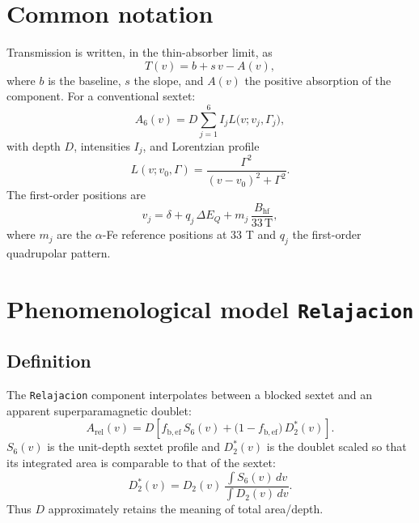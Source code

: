 \documentclass[11pt,a4paper]{article}
\newcommand{\BHF}{B_{\mathrm{hf}}}
\newcommand{\dEQ}{\Delta E_Q}
\newcommand{\code}[1]{\texttt{\small #1}}
\begin{document}
\section{Common notation}

Transmission is written, in the thin-absorber limit, as
\begin{equation}
  T(v)=b+s\,v-A(v),
\end{equation}
where $b$ is the baseline, $s$ the slope, and $A(v)$ the positive absorption of
the component. For a conventional sextet:
\begin{equation}
  A_{6}(v)=D\sum_{j=1}^{6} I_j L\bigl(v; v_j,\Gamma_j\bigr),
\end{equation}
with depth $D$, intensities $I_j$, and Lorentzian profile
\begin{equation}
  L(v;v_0,\Gamma)=\frac{\Gamma^2}{(v-v_0)^2+\Gamma^2}.
\end{equation}
The first-order positions are
\begin{equation}
  v_j = \delta + q_j\,\dEQ + m_j\,\frac{\BHF}{33\,\mathrm{T}},
\end{equation}
where $m_j$ are the $\alpha$-Fe reference positions at $33$ T and $q_j$ the
first-order quadrupolar pattern.

\section{Phenomenological model \code{Relajacion}}

\subsection{Definition}

The \code{Relajacion} component interpolates between a blocked sextet and an
apparent superparamagnetic doublet:
\begin{equation}
  A_{\mathrm{rel}}(v)=D\left[
  f_{\mathrm{b,ef}}\,S_6(v)
  +\bigl(1-f_{\mathrm{b,ef}}\bigr)\,D_2^{\ast}(v)
  \right].
  \label{eq:rel-phen}
\end{equation}
$S_6(v)$ is the unit-depth sextet profile and $D_2^{\ast}(v)$ is the doublet
scaled so that its integrated area is comparable to that of the sextet:
\begin{equation}
  D_2^{\ast}(v)=D_2(v)\,
  \frac{\int S_6(v)\,dv}{\int D_2(v)\,dv}.
\end{equation}
Thus $D$ approximately retains the meaning of total area/depth.
\end{document}
